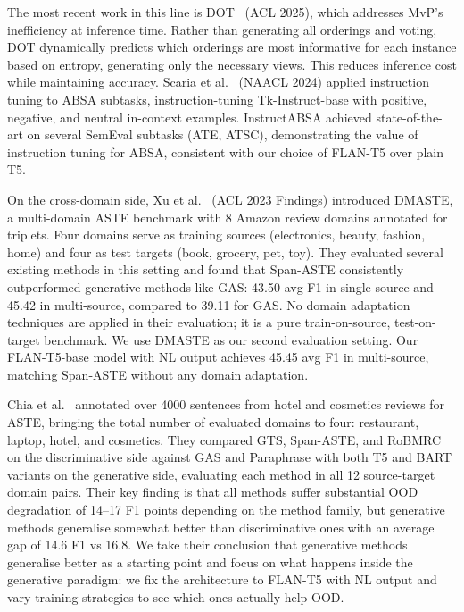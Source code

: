 \documentclass[12pt,a4paper]{report}
\begin{document}
The most recent work in this line is DOT~\cite{dot2025} (ACL 2025), which addresses MvP's inefficiency at inference time. Rather than generating all orderings and voting, DOT dynamically predicts which orderings are most informative for each instance based on entropy, generating only the necessary views. This reduces inference cost while maintaining accuracy. Scaria et al.~\cite{scaria2023instructabsa} (NAACL 2024) applied instruction tuning to ABSA subtasks, instruction-tuning Tk-Instruct-base with positive, negative, and neutral in-context examples. InstructABSA achieved state-of-the-art on several SemEval subtasks (ATE, ATSC), demonstrating the value of instruction tuning for ABSA, consistent with our choice of FLAN-T5 over plain T5.

On the cross-domain side, Xu et al.~\cite{xu2023dmaste} (ACL 2023 Findings) introduced DMASTE, a multi-domain ASTE benchmark with 8 Amazon review domains annotated for triplets. Four domains serve as training sources (electronics, beauty, fashion, home) and four as test targets (book, grocery, pet, toy). They evaluated several existing methods in this setting and found that Span-ASTE consistently outperformed generative methods like GAS: 43.50 avg F1 in single-source and 45.42 in multi-source, compared to 39.11 for GAS. No domain adaptation techniques are applied in their evaluation; it is a pure train-on-source, test-on-target benchmark. We use DMASTE as our second evaluation setting. Our FLAN-T5-base model with NL output achieves 45.45 avg F1 in multi-source, matching Span-ASTE without any domain adaptation.

Chia et al.~\cite{chia2022rethinking} annotated over 4000 sentences from hotel and cosmetics reviews for ASTE, bringing the total number of evaluated domains to four: restaurant, laptop, hotel, and cosmetics. They compared GTS, Span-ASTE, and RoBMRC on the discriminative side against GAS and Paraphrase with both T5 and BART variants on the generative side, evaluating each method in all 12 source-target domain pairs. Their key finding is that all methods suffer substantial OOD degradation of 14--17 F1 points depending on the method family, but generative methods generalise somewhat better than discriminative ones with an average gap of 14.6 F1 vs 16.8. We take their conclusion that generative methods generalise better as a starting point and focus on what happens inside the generative paradigm: we fix the architecture to FLAN-T5 with NL output and vary training strategies to see which ones actually help OOD.
\end{document}

